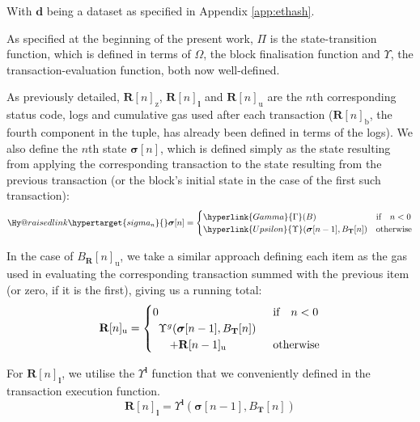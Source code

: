 \documentclass[9pt,oneside]{amsart}
\makeatletter
\newcommand{\linkdest}[1]{\Hy@raisedlink{\hypertarget{#1}{}}}
\makeatother
\begin{document}
\begin{multicols}{2}
With $\mathbf{d}$ being a dataset as specified in Appendix \ref{app:ethash}.

As specified at the beginning of the present work, \hyperlink{Pi}{$\Pi$} is the state-transition function, which is defined in terms of \hyperlink{Omega}{$\Omega$}, the block finalisation function and \hyperlink{Upsilon_state_transition}{$\Upsilon$}, the transaction-evaluation function, both now well-defined.

As previously detailed, $\mathbf{R}[n]_{\mathrm{z}}$, $\mathbf{R}[n]_{\mathbf{l}}$ and $\mathbf{R}[n]_{\mathrm{u}}$ are the $n$th corresponding status code, logs and cumulative gas used after each transaction ($\mathbf{R}[n]_{\mathrm{b}}$, the fourth component in the tuple, has already been defined in terms of the logs). We also define the $n$th state $\boldsymbol{\sigma}[n]$, which is defined simply as the state resulting from applying the corresponding transaction to the state resulting from the previous transaction (or the block's initial state in the case of the first such transaction):
\begin{equation}\linkdest{sigma_n}{}
\boldsymbol{\sigma}[n] = \begin{cases} \hyperlink{Gamma}{\Gamma}(B) & \text{if} \quad n < 0 \\ \hyperlink{Upsilon}{\Upsilon}(\boldsymbol{\sigma}[n - 1], B_{\mathbf{T}}[n]) & \text{otherwise} \end{cases}
\end{equation}

In the case of $B_{\mathbf{R}}[n]_{\mathrm{u}}$, we take a similar approach defining each item as the gas used in evaluating the corresponding transaction summed with the previous item (or zero, if it is the first), giving us a running total:
\begin{equation}
\mathbf{R}[n]_{\mathrm{u}} = \begin{cases} 0 & \text{if} \quad n < 0 \\
\begin{array}[b]{l}
\Upsilon^g(\boldsymbol{\sigma}[n - 1], B_{\mathbf{T}}[n])\\ \quad + \mathbf{R}[n-1]_{\mathrm{u}}
\end{array}
 & \text{otherwise} \end{cases}
\end{equation}

For $\mathbf{R}[n]_{\mathbf{l}}$, we utilise the \hyperlink{Upsilon_pow_l}{$\Upsilon^\mathbf{l}$} function that we conveniently defined in the transaction execution function.
\begin{equation}
\mathbf{R}[n]_{\mathbf{l}} =
\Upsilon^{\mathbf{l}}(\boldsymbol{\sigma}[n - 1], B_{\mathbf{T}}[n])
\end{equation}


\end{multicols}
\end{document}
